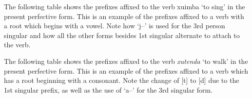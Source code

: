 The following table shows the prefixes affixed to the verb xuimba `to sing' in the present perfective form.  This is an example of the prefixes affixed to a verb with a root which begins with a vowel.  Note how `j--' is used for the 3rd person singular and how all the other forms besides 1st singular alternate to attach to the verb.

\noindent\begin{minipage}{\linewidth}
\small
{}
\normalsize
\end{minipage}

The following table shows the prefixes affixed to the verb \emph{xut\esh{}enda} `to walk' in the present perfective form.  This is an example of the prefixes affixed to a verb which has a root beginning with a consonant.  Note the change of [t\esh{}] to [d\ezh{}] due to the 1st singular prefix, as well as the use of `a--' for the 3rd singular form.


\noindent\begin{minipage}{\linewidth}
\normalsize
\end{minipage}

